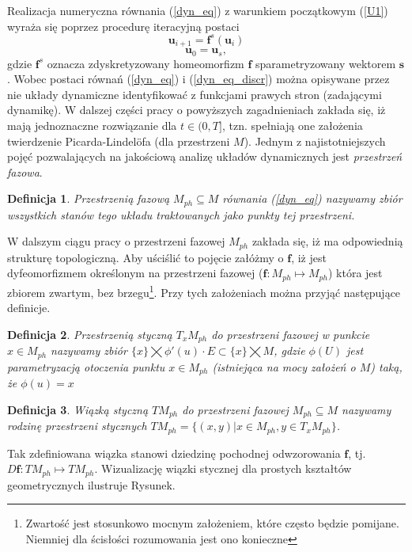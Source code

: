 \documentclass[12pt]{article}
\newtheorem{defi}{Definicja}
\begin{document}
Realizacja numeryczna równania (\ref{dyn_eq}) z warunkiem początkowym (\ref{U1}) wyraża się poprzez procedurę iteracyjną postaci
\begin{equation}
\textbf{u}_{i+1} = \textbf{f}^{s}(\textbf{u}_{i})
\label{dyn_eq_discr}
\end{equation}
\begin{equation}
\textbf{u}_{0} = \textbf{u}_{s},
\label{U2}
\end{equation}
gdzie $ \textbf{f}^{s} $ oznacza zdyskretyzowany homeomorfizm $ \textbf{f} $ sparametryzowany wektorem $ \textbf{s} $. Wobec postaci równań (\ref{dyn_eq}) i (\ref{dyn_eq_discr}) można opisywane przez nie układy dynamiczne identyfikować z funkcjami prawych stron (zadającymi dynamikę). W dalszej części pracy o powyższych zagadnieniach zakłada się, iż mają jednoznaczne rozwiązanie dla  $t\in(0,T]$, tzn. spełniają one założenia twierdzenie Picarda-Lindelöfa (dla przestrzeni $ M $). Jednym z najistotniejszych pojęć pozwalających na jakościową analizę układów dynamicznych jest \textit{przestrzeń fazowa}.
\begin{defi}\label{ph_space}
	Przestrzenią fazową $M_{ph} \subseteq M $ równania (\ref{dyn_eq}) nazywamy zbiór wszystkich stanów tego układu traktowanych jako punkty tej przestrzeni.
\end{defi}
W dalszym ciągu pracy o przestrzeni fazowej $ M_{ph} $ zakłada się, iż ma odpowiednią strukturę topologiczną. Aby uściślić to pojęcie załóżmy o $ \textbf{f} $, iż jest dyfeomorfizmem określonym na przestrzeni fazowej ($  \textbf{f}: M_{ph} \mapsto M_{ph}$) która jest zbiorem zwartym, bez brzegu\footnote{Zwartość jest stosunkowo mocnym założeniem, które często będzie pomijane. Niemniej dla ścisłości rozumowania jest ono konieczne}. Przy tych założeniach można przyjąć następujące definicje. 
\begin{defi}\label{tan_space}
	Przestrzenią styczną $ T_{x}M_{ph} $ do przestrzeni fazowej w punkcie $ x\in M_{ph} $ nazywamy zbiór $ \{x\} \bigtimes \phi'(u)\cdot E \subset \{x\}\bigtimes M$, gdzie $ \phi (U) $ jest parametryzacją otoczenia punktu $ x\in M_{ph} $ (istniejąca na mocy założeń o $ M $) taką, że $ \phi (u) = x $
\end{defi}
\begin{defi}\label{tan_bundle}
	Wiązką styczną $ TM_{ph} $ do przestrzeni fazowej $M_{ph} \subseteq M $ nazywamy rodzinę przestrzeni stycznych $  TM_{ph} = \{ (x,y) | x \in M_{ph} , y \in T_{x} M_{ph}\} $.
\end{defi}
Tak zdefiniowana wiązka stanowi dziedzinę pochodnej odwzorowania $ \textbf{f} $, tj. $ D\textbf{f}:TM_{ph} \mapsto TM_{ph}  $. Wizualizację wiązki stycznej dla prostych kształtów geometrycznych ilustruje Rysunek.
\end{document}
